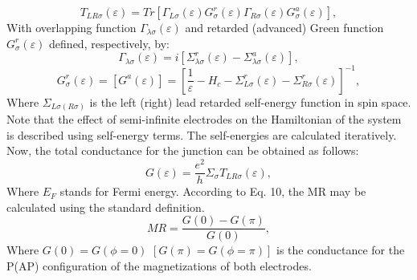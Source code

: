 \documentclass[twoside,twocolumn,9pt]{article}
\begin{document}
\begin{equation}
    T_{LR\sigma}(\varepsilon)=Tr [\Gamma_{L\sigma}(\varepsilon) G^{r}_{\sigma}(\varepsilon)\Gamma_{R\sigma}(\varepsilon) G^{a}_{\sigma}(\varepsilon)],
\end{equation}
With overlapping function ${{\Gamma}_{\lambda\sigma}}(\varepsilon)$  and retarded (advanced) Green function $G^{r}_{\sigma}(\varepsilon)$ defined, respectively, by:
\begin{equation}
    \Gamma_{\lambda\sigma}(\varepsilon)=i[\Sigma^{r}_{\lambda\sigma}(\varepsilon)-\Sigma^{a}_{\lambda\sigma}(\varepsilon)],
\end{equation}
\begin{equation}
    G^{r}_{\sigma}(\varepsilon )=[G^{a}(\varepsilon)]=[\frac{1}{\varepsilon}-H_{c}-\Sigma_{L\sigma}^{r}(\varepsilon)-\Sigma_{R\sigma}^{r}(\varepsilon)]^{-1},
\end{equation}
Where $\Sigma_{L\sigma(R\sigma)}$ is the left (right) lead retarded self-energy function in spin space\cite{zhou2016spin}. Note that the effect of semi-infinite electrodes on the Hamiltonian of the system is described using self-energy terms. The self-energies are calculated iteratively\cite{modarresi2011transport,norouzi2021controllable}.
Now, the total conductance for the junction can be obtained as follows:
\begin{equation}
    G(\varepsilon) =\frac{e^2}{h}\Sigma_{\sigma}T_{LR\sigma}(\varepsilon),
\end{equation}
Where $E_F$ stands for Fermi energy. According to Eq. 10, the MR may be calculated using the standard definition.
\begin{equation}
    MR = \frac{G(0)-G(\pi)}{G(0)},
\end{equation}
Where $G(0) = G(\phi= 0)$ $[G(\pi) = G(\phi=\pi)]$ is the conductance for the P(AP) configuration of the magnetizations of both electrodes.
\end{document}
